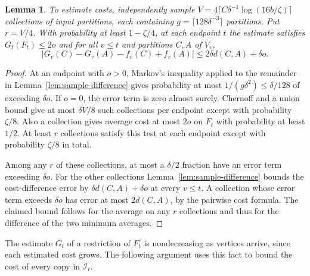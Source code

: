 \documentclass[11pt]{article}
\newtheorem{lemma}[theorem]{Lemma}
\begin{document}
\begin{lemma}\label{lem:online-eval}
To estimate costs, independently sample
$V=4\lceil C\delta^{-1}\log(16b/\zeta)\rceil$ collections of input
partitions, each containing $g=\lceil128\delta^{-3}\rceil$ partitions. Put $r=V/4$. With
probability at least $1-\zeta/4$, at each endpoint $t$ the estimate
satisfies $G_t(F_t)\le2o$ and for all $v\le t$ and partitions
$C,A$ of $V_v$,
\[
 |G_v(C)-G_v(A)-f_v(C)+f_v(A)|\le 2\delta d(C,A)+\delta o .
\]
\end{lemma}
\begin{proof}
At an endpoint with $o>0$, Markov's inequality applied to the
remainder in Lemma~\ref{lem:sample-difference} gives probability at
most $1/(g\delta^2)\le\delta/128$ of exceeding $\delta o$. If $o=0$,
the error term is zero almost surely. Chernoff and a union bound give at most
$\delta V/8$ such collections per endpoint except with probability
$\zeta/8$. Also a collection gives average cost at most $2o$ on $F_t$ with
probability at least $1/2$. At least $r$ collections satisfy this test
at each endpoint except with probability $\zeta/8$ in total.

Among any $r$ of these collections, at most a $\delta/2$ fraction have
an error term exceeding $\delta o$. For the other collections Lemma~\ref{lem:sample-difference}
bounds the cost-difference error by $\delta d(C,A)+\delta o$
at every $v\le t$. A collection whose error term exceeds $\delta o$ has error at most
$2d(C,A)$, by the pairwise cost formula. The claimed bound follows
for the average on any $r$ collections and thus for the difference of
the two minimum averages.
\end{proof}

The estimate $G_t$ of a restriction of $F_t$ is nondecreasing as vertices arrive, since
each estimated cost grows. The following argument uses this fact
to bound the cost of every copy in $\mathcal I_t$.
\end{document}
